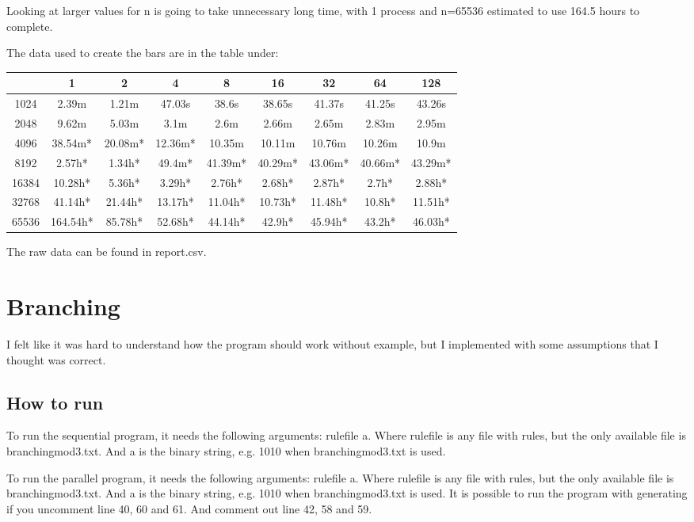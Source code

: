 \documentclass[a4paper]{extarticle}
\begin{document}
Looking at larger values for n is going to take unnecessary long time, with 1 process and n=65536 estimated to use 164.5 hours to complete.

The data used to create the bars are in the table under:
\begin{center}
  \begin{tabular}{ c | | c | c | c | c | c | c | c | c | }
  	 & 1 & 2 & 4 & 8 & 16 & 32 & 64 & 128 \\ \hline
    \hline
    1024 & 2.39m & 1.21m & 47.03s & 38.6s & 38.65s & 41.37s & 41.25s & 43.26s\\ \hline 
    2048 & 9.62m & 5.03m & 3.1m & 2.6m & 2.66m & 2.65m & 2.83m & 2.95m\\ \hline 
    4096 & 38.54m* & 20.08m* & 12.36m* & 10.35m & 10.11m & 10.76m & 10.26m & 10.9m\\ \hline 
    8192 & 2.57h* & 1.34h* & 49.4m* & 41.39m* & 40.29m* & 43.06m* & 40.66m* & 43.29m*\\ \hline 
    16384 & 10.28h* & 5.36h* & 3.29h* & 2.76h* & 2.68h* & 2.87h* & 2.7h* & 2.88h*\\ \hline 
    32768 & 41.14h* & 21.44h* & 13.17h* & 11.04h* & 10.73h* & 11.48h* & 10.8h* & 11.51h*\\ \hline 
    65536 & 164.54h* & 85.78h* & 52.68h* & 44.14h* & 42.9h* & 45.94h* & 43.2h* & 46.03h* \\
    \hline
  \end{tabular}
\end{center}

The raw data can be found in report.csv. 

\section{Branching}
I felt like it was hard to understand how the program should work without example, but I implemented with some assumptions that I thought was correct.

\subsection{How to run}
To run the sequential program, it needs the following arguments: rulefile a. Where rulefile is any file with rules, but the only available file is branchingmod3.txt. And a is the binary string, e.g. 1010 when branchingmod3.txt is used.

To run the parallel program, it needs the following arguments: rulefile a. Where rulefile is any file with rules, but the only available file is branchingmod3.txt. And a is the binary string, e.g. 1010 when branchingmod3.txt is used. It is possible to run the program with generating if you uncomment line 40, 60 and 61. And comment out line 42, 58 and 59.
\end{document}
